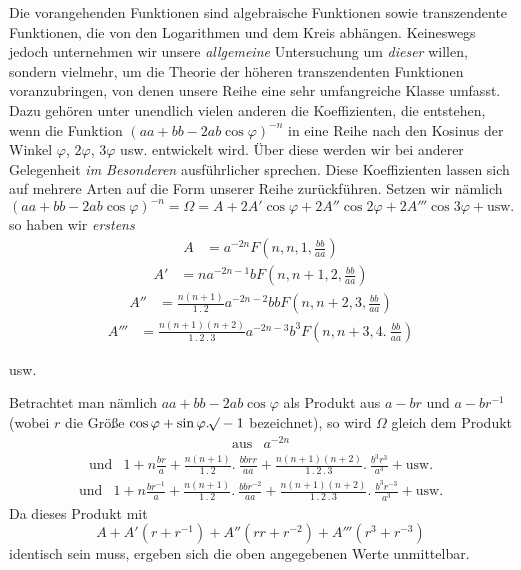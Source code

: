Die vorangehenden Funktionen sind algebraische Funktionen sowie transzendente Funktionen, die von den Logarithmen und dem Kreis abhängen. Keineswegs jedoch unternehmen wir unsere \textit{allgemeine} Untersuchung um \textit{dieser} willen, sondern vielmehr, um die Theorie der höheren transzendenten Funktionen voranzubringen, von denen unsere Reihe eine sehr umfangreiche Klasse umfasst. Dazu gehören unter unendlich vielen anderen die Koeffizienten, die entstehen, wenn die Funktion $(aa+bb-2ab\cos\varphi)^{-n}$ in eine Reihe nach den Kosinus der Winkel $\varphi$, $2\varphi$, $3\varphi$ usw. entwickelt wird. Über diese werden wir bei anderer Gelegenheit \textit{im Besonderen} ausführlicher sprechen. Diese Koeffizienten lassen sich auf mehrere Arten auf die Form unserer Reihe zurückführen. Setzen wir nämlich
\[
(aa+bb-2ab\cos\varphi)^{-n}=\Omega=A+2A'\cos\varphi+2A''\cos2\varphi+2A'''\cos3\varphi+\mbox{usw.}
\]
so haben wir \textit{erstens}
\[
\begin{array}{rl}
A&=a^{-2n}F(n,n,1,\frac{bb}{aa})
\end{array}
\]
\[
\begin{array}{rl}
A'&=na^{-2n-1}bF(n,n+1,2,\frac{bb}{aa})
\end{array}
\]
\[
\begin{array}{rl}
A''&=\frac{n(n+1)}{1\mathbin{.}2}a^{-2n-2}bbF(n,n+2,3,\frac{bb}{aa})
\end{array}
\]
\[
\begin{array}{rl}
A'''&=\frac{n(n+1)(n+2)}{1\mathbin{.}2\mathbin{.}3}a^{-2n-3}b^3F(n,n+3,4.\ \frac{bb}{aa})
\end{array}
\]
\begin{center}usw.\end{center}
Betrachtet man nämlich $aa+bb-2ab\cos\varphi$ als Produkt aus $a-br$ und $a-br^{-1}$ (wobei $r$ die Größe $\cos\varphi+\sin\varphi.\mathord{{}^{}\!\surd}-1$ bezeichnet), so wird $\Omega$ gleich dem Produkt
\[
\begin{array}{rl}
\mbox{aus}&a^{-2n}
\end{array}
\]
\[
\begin{array}{rl}
\mbox{und}&1+n\frac{br}{a}+\frac{n(n+1)}{1\mathbin{.}2}.\ \frac{bbrr}{aa}+\frac{n(n+1)(n+2)}{1\mathbin{.}2\mathbin{.}3}.\ \frac{b^3r^3}{a^3}+\mbox{usw.}
\end{array}
\]
\[
\begin{array}{rl}
\mbox{und}&1+n\frac{br^{-1}}{a}+\frac{n(n+1)}{1\mathbin{.}2}.\ \frac{bbr^{-2}}{aa}+\frac{n(n+1)(n+2)}{1\mathbin{.}2\mathbin{.}3}.\ \frac{b^3r^{-3}}{a^3}+\mbox{usw.}
\end{array}
\]
Da dieses Produkt mit
\[
A+A'(r+r^{-1})+A''(rr+r^{-2})+A'''(r^3+r^{-3})
\]
identisch sein muss, ergeben sich die oben angegebenen Werte unmittelbar.

